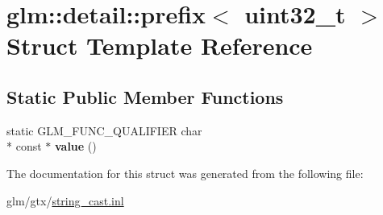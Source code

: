 \hypertarget{structglm_1_1detail_1_1prefix_3_01uint32__t_01_4}{\section{glm\-:\-:detail\-:\-:prefix$<$ uint32\-\_\-t $>$ Struct Template Reference}
\label{structglm_1_1detail_1_1prefix_3_01uint32__t_01_4}
}
\subsection*{Static Public Member Functions}
\begin{DoxyCompactItemize}
\item 
\hypertarget{structglm_1_1detail_1_1prefix_3_01uint32__t_01_4_a8a36d8e3a869d300408dde031429352e}{static G\-L\-M\-\_\-\-F\-U\-N\-C\-\_\-\-Q\-U\-A\-L\-I\-F\-I\-E\-R char \\*
const $\ast$ {\bfseries value} ()}\label{structglm_1_1detail_1_1prefix_3_01uint32__t_01_4_a8a36d8e3a869d300408dde031429352e}

\end{DoxyCompactItemize}


The documentation for this struct was generated from the following file\-:\begin{DoxyCompactItemize}
\item 
glm/gtx/\hyperlink{string__cast_8inl}{string\-\_\-cast.\-inl}\end{DoxyCompactItemize}
